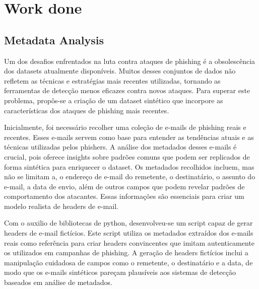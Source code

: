 \chapter{Work done}
\label{chapter:work_done}

\section{Metadata Analysis}

Um dos desafios enfrentados na luta contra ataques de phishing é a obsolescência dos datasets atualmente disponíveis. Muitos desses conjuntos de dados não refletem as técnicas e estratégias mais recentes utilizadas, tornando as ferramentas de detecção menos eficazes contra novos ataques. Para superar este problema, propôs-se a criação de um dataset sintético que incorpore as características dos ataques de phishing mais recentes.

Inicialmente, foi necessário recolher uma coleção de e-mails de phishing reais e recentes. Esses e-mails servem como base para entender as tendências atuais e as técnicas utilizadas pelos phishers. A análise dos metadados desses e-mails é crucial, pois oferece insights sobre padrões comuns que podem ser replicados de forma sintética para enriquecer o dataset. Os metadados recolhidos incluem, mas não se limitam a, o endereço de e-mail do remetente, o destinatário, o assunto do e-mail, a data de envio, além de outros campos que podem revelar padrões de comportamento dos atacantes. Essas informações são essenciais para criar um modelo realista de headers de e-mail.

Com o auxilio de bibliotecas de python, desenvolveu-se um script capaz de gerar headers de e-mail fictícios. Este script utiliza os metadados extraídos dos e-mails reais como referência para criar headers convincentes que imitam autenticamente os utilizados em campanhas de phishing. A geração de headers fictícios inclui a manipulação cuidadosa de campos como o remetente, o destinatário e a data, de modo que os e-mails sintéticos pareçam plausíveis aos sistemas de detecção baseados em análise de metadados.

